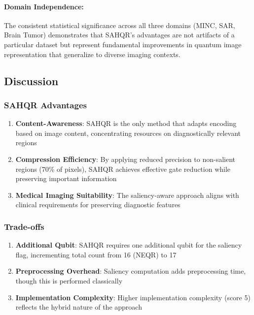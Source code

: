 \documentclass{ipol}
\begin{document}
\paragraph{Domain Independence:} The consistent statistical significance across all three domains (MINC, SAR, Brain Tumor) demonstrates that SAHQR's advantages are not artifacts of a particular dataset but represent fundamental improvements in quantum image representation that generalize to diverse imaging contexts.

\subsection{Discussion}

\subsubsection{SAHQR Advantages}

\begin{enumerate}
\item \textbf{Content-Awareness}: SAHQR is the only method that adapts encoding based on image content, concentrating resources on diagnostically relevant regions
\item \textbf{Compression Efficiency}: By applying reduced precision to non-salient regions (70\% of pixels), SAHQR achieves effective gate reduction while preserving important information
\item \textbf{Medical Imaging Suitability}: The saliency-aware approach aligns with clinical requirements for preserving diagnostic features
\end{enumerate}

\subsubsection{Trade-offs}

\begin{enumerate}
\item \textbf{Additional Qubit}: SAHQR requires one additional qubit for the saliency flag, incrementing total count from 16 (NEQR) to 17
\item \textbf{Preprocessing Overhead}: Saliency computation adds preprocessing time, though this is performed classically
\item \textbf{Implementation Complexity}: Higher implementation complexity (score 5) reflects the hybrid nature of the approach
\end{enumerate}
\end{document}
